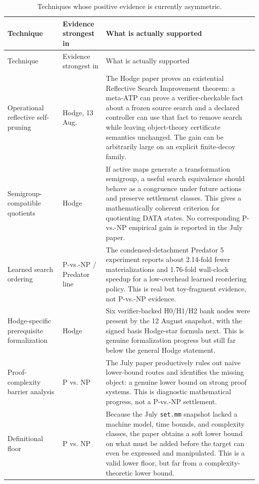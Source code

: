 \documentclass[11pt]{article}
\begin{document}
\begin{longtable}{@{}p{}p{}p{}@{}}
\caption{Techniques whose positive evidence is currently asymmetric.}\\
\toprule
Technique & Evidence strongest in & What is actually supported \\
\midrule
\endfirsthead
\toprule
Technique & Evidence strongest in & What is actually supported \\
\midrule
\endhead
Operational reflective self-pruning & Hodge, 13 Aug. & The Hodge paper proves an existential Reflective Search Improvement theorem: a meta-ATP can prove a verifier-checkable fact about a frozen source search and a declared controller can use that fact to remove search while leaving object-theory certificate semantics unchanged.  The gain can be arbitrarily large on an explicit finite-decoy family. \\
\addlinespace
Semigroup-compatible quotients & Hodge & If active maps generate a transformation semigroup, a useful search equivalence should behave as a congruence under future actions and preserve settlement classes.  This gives a mathematically coherent criterion for quotienting DATA states.  No corresponding P-vs.-NP empirical gain is reported in the July paper. \\
\addlinespace
Learned search ordering & P-vs.-NP / Predator line & The condensed-detachment Predator 5 experiment reports about 2.14-fold fewer materializations and 1.76-fold wall-clock speedup for a low-overhead learned reordering policy.  This is real but toy-fragment evidence, not P-vs.-NP evidence. \\
\addlinespace
Hodge-specific prerequisite formalization & Hodge & Six verifier-backed H0/H1/H2 bank nodes were present by the 12 August snapshot, with the signed basis Hodge-star formula next.  This is genuine formalization progress but still far below the general Hodge statement. \\
\addlinespace
Proof-complexity barrier analysis & P vs. NP & The July paper productively rules out naive lower-bound routes and identifies the missing object: a genuine lower bound on strong proof systems.  This is diagnostic mathematical progress, not a P-vs.-NP settlement. \\
\addlinespace
Definitional floor & P vs. NP & Because the July \texttt{set.mm} snapshot lacked a machine model, time bounds, and complexity classes, the paper obtains a soft lower bound on what must be added before the target can even be expressed and manipulated.  This is a valid lower floor, but far from a complexity-theoretic lower bound. \\
\bottomrule
\end{longtable}
\end{document}
